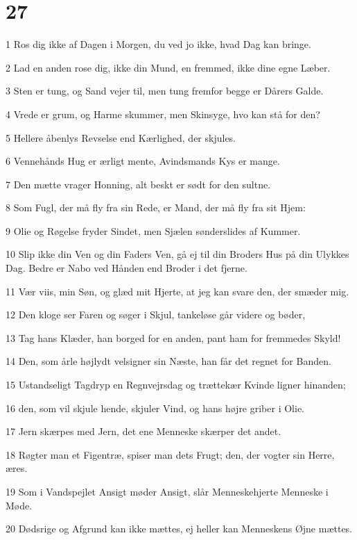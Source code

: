 \chapter{27}

\par 1 Ros dig ikke af Dagen i Morgen, du ved jo ikke, hvad Dag kan bringe.
\par 2 Lad en anden rose dig, ikke din Mund, en fremmed, ikke dine egne Læber.
\par 3 Sten er tung, og Sand vejer til, men tung fremfor begge er Dårers Galde.
\par 4 Vrede er grum, og Harme skummer, men Skinsyge, hvo kan stå for den?
\par 5 Hellere åbenlys Revselse end Kærlighed, der skjules.
\par 6 Vennehånds Hug er ærligt mente, Avindsmands Kys er mange.
\par 7 Den mætte vrager Honning, alt beskt er sødt for den sultne.
\par 8 Som Fugl, der må fly fra sin Rede, er Mand, der må fly fra sit Hjem:
\par 9 Olie og Røgelse fryder Sindet, men Sjælen sønderslides af Kummer.
\par 10 Slip ikke din Ven og din Faders Ven, gå ej til din Broders Hus på din Ulykkes Dag. Bedre er Nabo ved Hånden end Broder i det fjerne.
\par 11 Vær viis, min Søn, og glæd mit Hjerte, at jeg kan svare den, der smæder mig.
\par 12 Den kloge ser Faren og søger i Skjul, tankeløse går videre og bøder,
\par 13 Tag hans Klæder, han borged for en anden, pant ham for fremmedes Skyld!
\par 14 Den, som årle højlydt velsigner sin Næste, han får det regnet for Banden.
\par 15 Ustandseligt Tagdryp en Regnvejrsdag og trættekær Kvinde ligner hinanden;
\par 16 den, som vil skjule hende, skjuler Vind, og hans højre griber i Olie.
\par 17 Jern skærpes med Jern, det ene Menneske skærper det andet.
\par 18 Røgter man et Figentræ, spiser man dets Frugt; den, der vogter sin Herre, æres.
\par 19 Som i Vandspejlet Ansigt møder Ansigt, slår Menneskehjerte Menneske i Møde.
\par 20 Dødsrige og Afgrund kan ikke mættes, ej heller kan Menneskens Øjne mættes.
